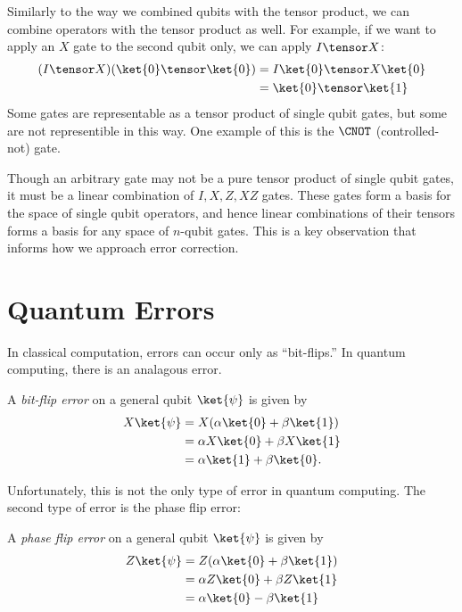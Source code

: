 \documentclass{article}
\begin{document}
        Similarly to the way we combined qubits with the tensor product, we can combine operators with the tensor product as well.
        For example, if we want to apply an $X$ gate to the second qubit only, we can apply $I \tensor X$:
        \begin{align*}
        (I \tensor X)(\ket{0} \tensor \ket{0}) &= I \ket{0} \tensor X \ket{0}\\
        &= \ket{0} \tensor \ket{1}
        \end{align*}
        Some gates are representable as a tensor product of single qubit gates, but some are not representible in this way.
        One example of this is the $\CNOT$ (controlled-not) gate.

        Though an arbitrary gate may not be a pure tensor product of single qubit gates, it must be a linear combination of $I, X, Z, XZ$ gates.
        These gates form a basis for the space of single qubit operators, and hence linear combinations of their tensors forms a basis for any space of $n$-qubit gates.
        This is a key observation that informs how we approach error correction.

\section{Quantum Errors}

        In classical computation, errors can occur only as ``bit-flips.''
        In quantum computing, there is an analagous error.
        \begin{definition}
                A \textit{bit-flip error} on a general qubit $\ket{\psi}$ is given by
                \begin{align*}
                X \ket{\psi} &= X(\alpha \ket{0} + \beta \ket{1})\\
                &= \alpha X \ket{0} + \beta X \ket{1}\\
                &= \alpha \ket{1} + \beta \ket{0}.
                \end{align*}
        \end{definition}

        Unfortunately, this is not the only type of error in quantum computing.
        The second type of error is the phase flip error:
        \begin{definition}
                A \textit{phase flip error} on a general qubit $\ket{\psi}$ is given by
                \begin{align*}
                Z \ket{\psi} &= Z(\alpha \ket{0} + \beta \ket{1})\\
                &= \alpha Z \ket{0} + \beta Z \ket{1}\\
                &= \alpha \ket{0} - \beta \ket{1}
                \end{align*}
        \end{definition}
\end{document}
